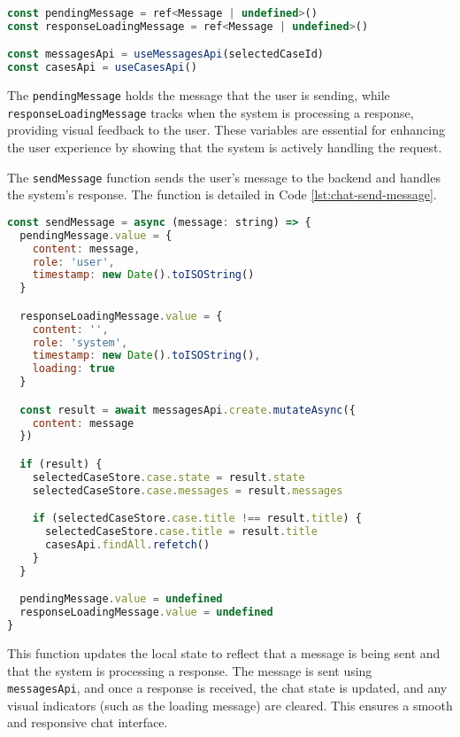 \begin{lstlisting}[language=JavaScript, caption={Reactive Variables for Message Tracking (\texttt{Chat.vue})},
  firstnumber=10,label={lst:chat-reactive-variables}]
const pendingMessage = ref<Message | undefined>()
const responseLoadingMessage = ref<Message | undefined>()

const messagesApi = useMessagesApi(selectedCaseId)
const casesApi = useCasesApi()
\end{lstlisting}

The \texttt{pendingMessage} holds the message
that the user is sending, while \texttt{responseLoadingMessage} tracks when the system is processing a response,
providing visual feedback to the user. These variables are essential
for enhancing the user experience by showing that the system is actively handling the request.

The \texttt{sendMessage} function sends the user’s message to the backend and handles the system’s response. The
function is detailed in Code \ref{lst:chat-send-message}.

\begin{lstlisting}[language=JavaScript, caption={Send Message Function (\texttt{Chat.vue})},
  firstnumber=32,label={lst:chat-send-message}]
const sendMessage = async (message: string) => {
  pendingMessage.value = {
    content: message,
    role: 'user',
    timestamp: new Date().toISOString()
  }

  responseLoadingMessage.value = {
    content: '',
    role: 'system',
    timestamp: new Date().toISOString(),
    loading: true
  }

  const result = await messagesApi.create.mutateAsync({
    content: message
  })

  if (result) {
    selectedCaseStore.case.state = result.state
    selectedCaseStore.case.messages = result.messages

    if (selectedCaseStore.case.title !== result.title) {
      selectedCaseStore.case.title = result.title
      casesApi.findAll.refetch()
    }
  }

  pendingMessage.value = undefined
  responseLoadingMessage.value = undefined
}
\end{lstlisting}

This function updates the local state to reflect that
a message is being sent and that the system is processing a response. The message is sent using \texttt{
messagesApi}, and once a response is received, the chat state is updated, and any visual indicators
(such as the loading message) are cleared. This ensures a smooth and responsive chat interface.

